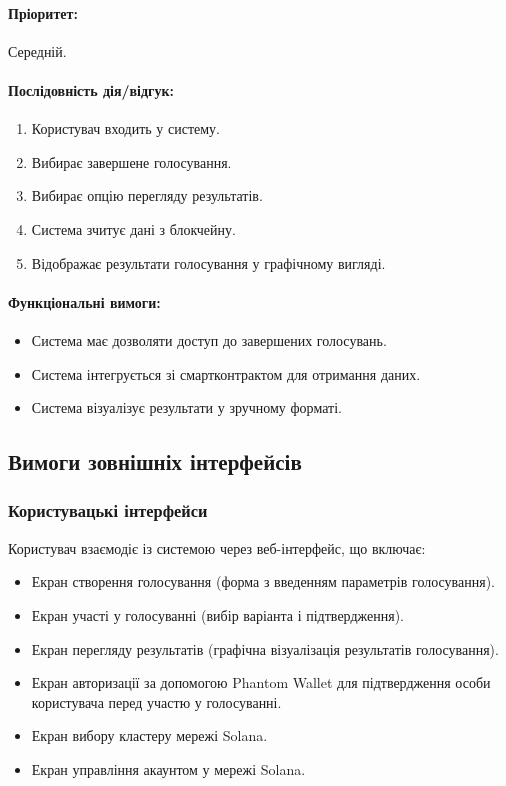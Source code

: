 \documentclass[14pt]{extreport}
\newcounter{req}[subsubsection]
\newcommand\req{\arabic{req}\stepcounter{req}}
\begin{document}
  \paragraph{Пріоритет:} Середній.  
  \paragraph{Послідовність дія/відгук:}  
  \begin{enumerate}  
      \item Користувач входить у систему.  
      \item Вибирає завершене голосування.  
      \item Вибирає опцію перегляду результатів.  
      \item Система зчитує дані з блокчейну.  
      \item Відображає результати голосування у графічному вигляді.  
  \end{enumerate}  
  \paragraph{Функціональні вимоги:}  
  \begin{itemize}[leftmargin=*,label=REQ-.\req:]  
      \item Система має дозволяти доступ до завершених голосувань.  
      \item Система інтегрується зі смартконтрактом для отримання даних.  
      \item Система візуалізує результати у зручному форматі.
  \end{itemize}  

  \subsection{Вимоги зовнішніх інтерфейсів}
  \subsubsection{Користувацькі інтерфейси}
  Користувач взаємодіє із системою через веб-інтерфейс, що включає:
  \begin{itemize}
    \item Екран створення голосування (форма з введенням параметрів голосування).
    \item Екран участі у голосуванні (вибір варіанта і підтвердження).
    \item Екран перегляду результатів (графічна візуалізація результатів голосування).
    \item Екран авторизації за допомогою Phantom Wallet для підтвердження особи користувача перед участю у голосуванні.
    \item Екран вибору кластеру мережі Solana.
    \item Екран управління акаунтом у мережі Solana.
  \end{itemize}
  
\end{document}
